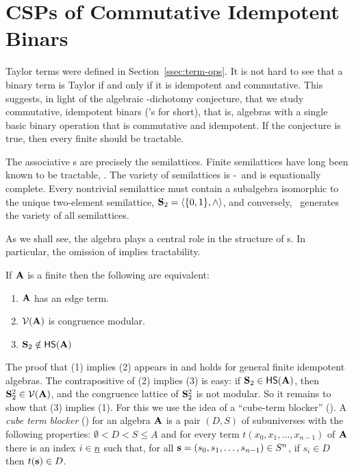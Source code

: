 

\section{CSPs of Commutative Idempotent Binars}
\label{sec:csps-comm-idemp}

Taylor terms were defined in Section~\ref{ssec:term-ops}. It is not hard to see that a binary 
term is Taylor if and only if it is idempotent and commutative. This suggests, in light of the 
algebraic \csp-dichotomy conjecture, that we study commutative, idempotent binars (\cib's for 
short), that is, algebras with a single basic binary operation that is commutative and 
idempotent. If the conjecture is true, then every finite \cib should be tractable. 

The associative {\cib}s are precisely the semilattices. Finite semilattices have long been known to be tractable, 
\cite{MR1481313}. The variety of semilattices is \sd-\meet\ and is equationally complete. Every nontrivial semilattice 
must contain a subalgebra isomorphic to the unique two-element semilattice, $\mathbf S_2=\langle\{0,1\},\wedge\rangle$, and conversely, \slt\ generates the variety of all semilattices.

As we shall see, the algebra \slt plays a central role in the structure of {\cib}s. In particular, the omission of \slt implies tractability. 

\begin{theorem}
  \label{thm:omit5-cib}
  If $\mathbf{A}$ is a finite \cib then the following are equivalent:
  \begin{enumerate}[(1)]
  \item $\mathbf{A}$ has an edge term.
  \item $\mathcal{V}(\mathbf{A})$ is congruence modular.
  \item $\mathbf S_2 \notin \mathsf{H} \mathsf{S} (\mathbf{A})$ 
    \end{enumerate}
\end{theorem}
The proof that (1) implies (2) appears in \cite{MR2563736} and holds for general
finite idempotent algebras. The contrapositive of (2) implies (3) is easy: 
if 
$\mathbf S_2 \in \mathsf{H} \mathsf{S} (\mathbf{A})$, then 
$\mathbf S_2^2 \in \mathcal{V}(\mathbf{A})$, and the congruence
lattice of $\mathbf S_2^2$ is not modular.
So it remains to show that (3) implies (1). For this we use the idea of a 
``cube-term blocker'' (\cite{MR2926316}).
  A \emph{cube term blocker} (\ctb) for an algebra $\mathbf{A}$ is a pair $(D, S)$ of subuniverses
  with the following properties: $\emptyset < D < S\leq A$ and for every term 
  $t(x_0, x_1, \dots, x_{n-1})$ of $\mathbf{A}$ there is an index $i \in \underline{n}$ such that, 
  for all $\mathbf{s} = (s_0, s_1, \dots, s_{n-1}) \in S^n$, if $s_i \in D$ 
  then $t(\mathbf{s})\in D$.

